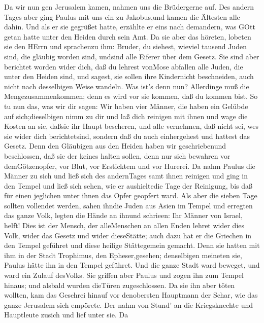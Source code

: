  Da wir nun gen Jerusalem kamen, nahmen uns die Brüdergerne
auf.  Des andern Tages aber ging Paulus mit uns ein zu
Jakobus,und kamen die Ältesten alle dahin.  Und als er sie
gegrüßet hatte, erzählte er eins nach demandern, was GOtt getan hatte
unter den Heiden durch sein Amt.  Da sie aber das höreten,
lobeten sie den HErrn und sprachenzu ihm: Bruder, du siehest, wieviel
tausend Juden sind, die gläubig worden sind, undsind alle Eiferer über
dem Gesetz.  Sie sind aber berichtet worden wider dich, daß
du lehrest vonMose abfallen alle Juden, die unter den Heiden sind, und
sagest, sie sollen ihre Kindernicht beschneiden, auch nicht nach
desselbigen Weise wandeln.  Was ist's denn nun? Allerdinge
muß die Mengezusammenkommen; denn es wird vor sie kommen, daß du kommen
bist.  So tu nun das, was wir dir sagen:  Wir
haben vier Männer, die haben ein Gelübde auf sich;dieselbigen nimm zu
dir und laß dich reinigen mit ihnen und wage die Kosten an sie, daßsie
ihr Haupt bescheren, und alle vernehmen, daß nicht sei, wes sie wider
dich berichtetsind, sondern daß du auch einhergehest und hattest das
Gesetz.  Denn den Gläubigen aus den Heiden haben wir
geschriebenund beschlossen, daß sie der keines halten sollen, denn nur
sich bewahren vor demGötzenopfer, vor Blut, vor Ersticktem und vor
Hurerei.  Da nahm Paulus die Männer zu sich und ließ sich
des andernTages samt ihnen reinigen und ging in den Tempel und ließ sich
sehen, wie er aushieltedie Tage der Reinigung, bis daß für einen
jeglichen unter ihnen das Opfer geopfert ward.  Als aber
die sieben Tage sollten vollendet werden, sahen ihndie Juden aus Asien
im Tempel und erregten das ganze Volk, legten die Hände an ihnund
schrieen:  Ihr Männer von Israel, helft! Dies ist der
Mensch, der alleMenschen an allen Enden lehret wider dies Volk, wider
das Gesetz und wider dieseStätte; auch dazu hat er die Griechen in den
Tempel geführet und diese heilige Stättegemein gemacht. 
Denn sie hatten mit ihm in der Stadt Trophimus, den Epheser,gesehen;
denselbigen meineten sie, Paulus hätte ihn in den Tempel geführet.
 Und die ganze Stadt ward beweget, und ward ein Zulauf
desVolks. Sie griffen aber Paulus und zogen ihn zum Tempel hinaus; und
alsbald wurden dieTüren zugeschlossen.  Da sie ihn aber
töten wollten, kam das Geschrei hinauf vor denobersten Hauptmann der
Schar, wie das ganze Jerusalem sich empörete.  Der nahm von
Stund' an die Kriegsknechte und Hauptleute zusich und lief unter sie. Da
